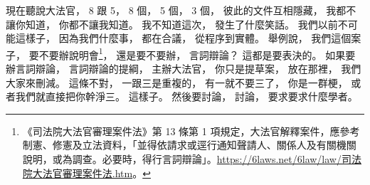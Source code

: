 \hypertarget{w01:cue:1089}{}現在聽說大法官，
\hypertarget{w01:cue:1090}{}8 跟 5，
\hypertarget{w01:cue:1091}{}8 個，
\hypertarget{w01:cue:1092}{}5 個，
\hypertarget{w01:cue:1093}{}3 個，
\hypertarget{w01:cue:1094}{}彼此的文件互相隱藏，
\hypertarget{w01:cue:1095}{}我都不讓你知道，
\hypertarget{w01:cue:1096}{}你都不讓我知道。
\hypertarget{w01:cue:1097}{}我不知道這次，
\hypertarget{w01:cue:1098}{}發生了什麼笑話。
\hypertarget{w01:cue:1099}{}我們以前不可能這樣子，
\hypertarget{w01:cue:1100}{}因為我們什麼事，
\hypertarget{w01:cue:1101}{}都在合議，
\hypertarget{w01:cue:1102}{}從程序到實體。
\hypertarget{w01:cue:1103}{}舉例說，
\hypertarget{w01:cue:1104}{}我們這個案子，
\hypertarget{w01:cue:1105}{}要不要辦說明會\footnote{《司法院大法官審理案件法》第 13 條第 1 項規定，大法官解釋案件，應參考制憲、修憲及立法資料，「並得依請求或逕行通知聲請人、關係人及有關機關說明，或為調查。必要時，得行言詞辯論」。\href{https://6laws.net/6law/law/\%E5\%8F\%B8\%E6\%B3\%95\%E9\%99\%A2\%E5\%A4\%A7\%E6\%B3\%95\%E5\%AE\%98\%E5\%AF\%A9\%E7\%90\%86\%E6\%A1\%88\%E4\%BB\%B6\%E6\%B3\%95.htm}{https://6laws.net/6law/law/司法院大法官審理案件法.htm}。}，
\hypertarget{w01:cue:1106}{}還是要不要辦，
\hypertarget{w01:cue:1107}{}言詞辯論？
\hypertarget{w01:cue:1108}{}這都是要表決的。
\hypertarget{w01:cue:1109}{}如果要辦言詞辯論，
\hypertarget{w01:cue:1110}{}言詞辯論的提綱，
\hypertarget{w01:cue:1111}{}主辦大法官，
\hypertarget{w01:cue:1112}{}你只是提草案，
\hypertarget{w01:cue:1113}{}放在那裡，
\hypertarget{w01:cue:1114}{}我們大家來刪減。
\hypertarget{w01:cue:1115}{}這條不對，
\hypertarget{w01:cue:1116}{}一跟三是重複的，
\hypertarget{w01:cue:1117}{}有一就不要三了，
\hypertarget{w01:cue:1118}{}你是一群梗，
\hypertarget{w01:cue:1119}{}或者我們就直接把你幹淨三。
\hypertarget{w01:cue:1120}{}這樣子。
\hypertarget{w01:cue:1121}{}然後要討論，
\hypertarget{w01:cue:1122}{}討論，
\hypertarget{w01:cue:1123}{}要求要求什麼學者。

